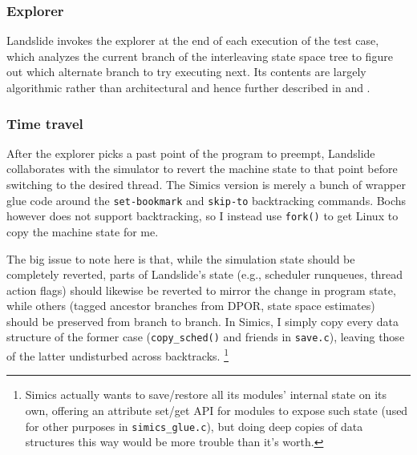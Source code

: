 \subsubsection{Explorer}

Landslide invokes the explorer at the end of each execution of the test case,
which analyzes the current branch of the interleaving state space tree
to figure out which alternate branch to try executing next.
Its contents are largely algorithmic rather than architectural
and hence further described in \sect{\ref{sec:landslide-dpor}} and \sect{\ref{sec:landslide-icb}}.

\subsubsection{Time travel}
\label{sec:landslide-timetravel}

After the explorer picks a past point of the program to preempt, %
Landslide collaborates with the simulator to revert the machine state to that point before switching to the desired thread.
The Simics version is merely a bunch of wrapper glue code around the {\tt set-bookmark} and {\tt skip-to} backtracking commands.
Bochs however does not support backtracking, so I instead use {\tt fork()} to get Linux to copy the machine state for me.

The big issue to note here is that, while the simulation state should be completely reverted,
parts of Landslide's state (e.g., scheduler runqueues, thread action flags)
should likewise be reverted to mirror the change in program state,
while others (tagged ancestor branches from DPOR, state space estimates) should be preserved from branch to branch.
In Simics, I simply copy every data structure of the former case ({\tt copy\_sched()} and friends in {\tt save.c}),
leaving those of the latter undisturbed across backtracks.%
\footnote{Simics actually wants to save/restore all its modules' internal state on its own,
offering an attribute set/get API for modules to expose such state (used for other purposes in {\tt simics\_glue.c}),
but doing deep copies of data structures this way would be more trouble than it's worth.}


